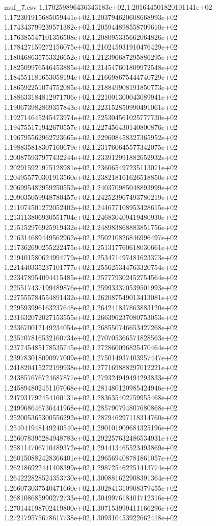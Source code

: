 \begin{filecontents*}{muf_7.csv}
1.170259896436343183e+02,1.201644501820101141e+02
1.172301915685059441e+02,1.203794620608668993e+02
1.174343799239571382e+02,1.205944898558709610e+02
1.176385547101356508e+02,1.208095335662064826e+02
1.178427159272156075e+02,1.210245931910476429e+02
1.180468635753326652e+02,1.212396687295886295e+02
1.182509976546453885e+02,1.214547601809972548e+02
1.184551181653058194e+02,1.216698675444740729e+02
1.186592251074752085e+02,1.218849908191850773e+02
1.188633184812971706e+02,1.221001300043089941e+02
1.190673982869357843e+02,1.223152850990491061e+02
1.192714645245473974e+02,1.225304561025777730e+02
1.194755171942670557e+02,1.227456430140800876e+02
1.196795562962723665e+02,1.229608458327365952e+02
1.198835818307160679e+02,1.231760645577342075e+02
1.200875937977432244e+02,1.233912991882652932e+02
1.202915921975128981e+02,1.236065497235113071e+02
1.204955770301913560e+02,1.238218161626518850e+02
1.206995482959250552e+02,1.240370985048893999e+02
1.209035059948780457e+02,1.242523967493780219e+02
1.211074501272052402e+02,1.244677108953428615e+02
1.213113806930551704e+02,1.246830409419480930e+02
1.215152976925919432e+02,1.248983868883851756e+02
1.216314689449562962e+02,1.250210826846996497e+02
1.217362690255222475e+02,1.251317760618030661e+02
1.219401580624994779e+02,1.253471497481623373e+02
1.221440335237101777e+02,1.255625344763320754e+02
1.223478954094415485e+02,1.257779302452754564e+02
1.225517437199489876e+02,1.259933370539501993e+02
1.227555784554891432e+02,1.262087549013413081e+02
1.229593996163237648e+02,1.264241837863883120e+02
1.231632072027153555e+02,1.266396237080753053e+02
1.233670012149234054e+02,1.268550746653427268e+02
1.235707816532160734e+02,1.270705366571828563e+02
1.237745485178535745e+02,1.272860096825470464e+02
1.239783018090977009e+02,1.275014937403957447e+02
1.241820415272199938e+02,1.277169888297012221e+02
1.243857676724687877e+02,1.279324949494293833e+02
1.245894802451107068e+02,1.281480120985424946e+02
1.247931792454160131e+02,1.283635402759955468e+02
1.249968646736441968e+02,1.285790794807680868e+02
1.252005365300556292e+02,1.287946297118314760e+02
1.254041948149240540e+02,1.290101909681325196e+02
1.256078395284948783e+02,1.292257632486534931e+02
1.258114706710489372e+02,1.294413465523493869e+02
1.260150882428366401e+02,1.296569408781861057e+02
1.262186922441408399e+02,1.298725462251413774e+02
1.264222828524353730e+02,1.300881622908391364e+02
1.266073037540471660e+02,1.302841310908379455e+02
1.268108685990272733e+02,1.304997618401712316e+02
1.270144198702419800e+02,1.307153999411166296e+02
1.272179575678617738e+02,1.309310453922662418e+02

\end{filecontents*}
